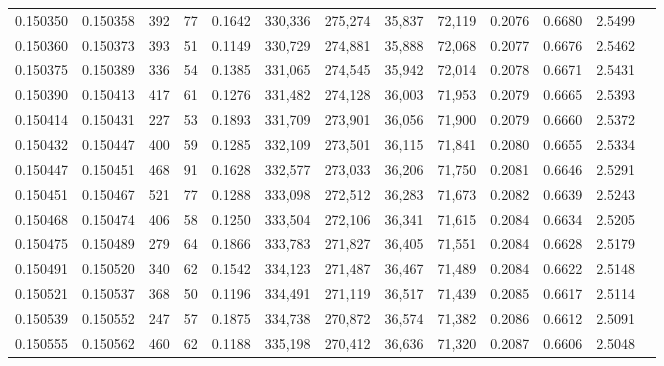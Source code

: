 \begin{tabular}{rrrrrrrrrrrrr}
0.150350 & 0.150358 &   392 &  77 &                                     0.1642 & 330,336 & 275,274 &  35,837 &  72,119 & 0.2076 & 0.6680 & 2.5499 \\
0.150360 & 0.150373 &   393 &  51 &                                     0.1149 & 330,729 & 274,881 &  35,888 &  72,068 & 0.2077 & 0.6676 & 2.5462 \\
0.150375 & 0.150389 &   336 &  54 &                                     0.1385 & 331,065 & 274,545 &  35,942 &  72,014 & 0.2078 & 0.6671 & 2.5431 \\
0.150390 & 0.150413 &   417 &  61 &                                     0.1276 & 331,482 & 274,128 &  36,003 &  71,953 & 0.2079 & 0.6665 & 2.5393 \\
0.150414 & 0.150431 &   227 &  53 &                                     0.1893 & 331,709 & 273,901 &  36,056 &  71,900 & 0.2079 & 0.6660 & 2.5372 \\
0.150432 & 0.150447 &   400 &  59 &                                     0.1285 & 332,109 & 273,501 &  36,115 &  71,841 & 0.2080 & 0.6655 & 2.5334 \\
0.150447 & 0.150451 &   468 &  91 &                                     0.1628 & 332,577 & 273,033 &  36,206 &  71,750 & 0.2081 & 0.6646 & 2.5291 \\
0.150451 & 0.150467 &   521 &  77 &                                     0.1288 & 333,098 & 272,512 &  36,283 &  71,673 & 0.2082 & 0.6639 & 2.5243 \\
0.150468 & 0.150474 &   406 &  58 &                                     0.1250 & 333,504 & 272,106 &  36,341 &  71,615 & 0.2084 & 0.6634 & 2.5205 \\
0.150475 & 0.150489 &   279 &  64 &                                     0.1866 & 333,783 & 271,827 &  36,405 &  71,551 & 0.2084 & 0.6628 & 2.5179 \\
0.150491 & 0.150520 &   340 &  62 &                                     0.1542 & 334,123 & 271,487 &  36,467 &  71,489 & 0.2084 & 0.6622 & 2.5148 \\
0.150521 & 0.150537 &   368 &  50 &                                     0.1196 & 334,491 & 271,119 &  36,517 &  71,439 & 0.2085 & 0.6617 & 2.5114 \\
0.150539 & 0.150552 &   247 &  57 &                                     0.1875 & 334,738 & 270,872 &  36,574 &  71,382 & 0.2086 & 0.6612 & 2.5091 \\
0.150555 & 0.150562 &   460 &  62 &                                     0.1188 & 335,198 & 270,412 &  36,636 &  71,320 & 0.2087 & 0.6606 & 2.5048 \\

\end{tabular}
